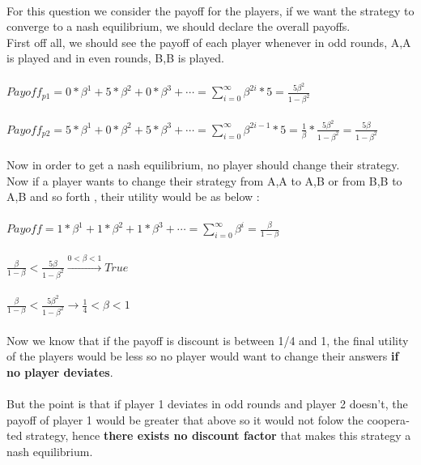 \\
\begin{latin}
  For this question we consider the payoff for the players, if we want the strategy to converge to a nash equilibrium,
  we should declare the overall payoffs.\\
  First off all, we should see the payoff of each player whenever in odd rounds, A,A is played and in even rounds, B,B is played.
  \\\\
  $Payoff_{p1} =0 * \beta^1 + 5 * \beta^2 + 0*\beta^3 + \cdots =  \sum_{i=0}^{\infty} \beta^{2i} * 5 = \frac{5\beta^2}{1-\beta^2}$\\\\
  $Payoff_{p2} =5 * \beta^1 + 0 * \beta^2 + 5*\beta^3 + \cdots = \sum_{i=0}^{\infty} \beta^{2i-1} * 5 = \frac{1}{\beta} * \frac{5\beta^2}{1-\beta^2} = \frac{5\beta}{1-\beta^2}$\\\\
  Now in order to get a nash equilibrium, no player should change their strategy. Now if a player wants to change their strategy from A,A to A,B or from B,B to A,B and so forth
  , their utility would be as below : \\\\
  $Payoff = 1 * \beta^1 + 1 * \beta^2 + 1*\beta^3 + \cdots =  \sum_{i=0}^{\infty} \beta^{i} =\frac{\beta}{1-\beta}$\\\\
  $\frac{\beta}{1-\beta} < \frac{5\beta}{1-\beta^2} \xrightarrow[]{0<\beta<1} True$\\\\
  $\frac{\beta}{1-\beta} < \frac{5\beta^2}{1-\beta^2} \rightarrow \frac{1}{4}<\beta<1$
  \\\\
  Now we know that if the payoff is discount is between 1/4 and 1, the final utility of the players would be less so no player would want to change their answers \textbf{if no player deviates}. \\\\
  But the point is that if player 1 deviates in odd rounds and player 2 doesn't, the payoff of player 1 would be greater that above so it would not folow the cooperated strategy, hence \textbf{there exists no discount factor} 
  that makes this strategy a nash equilibrium.
\end{latin}
